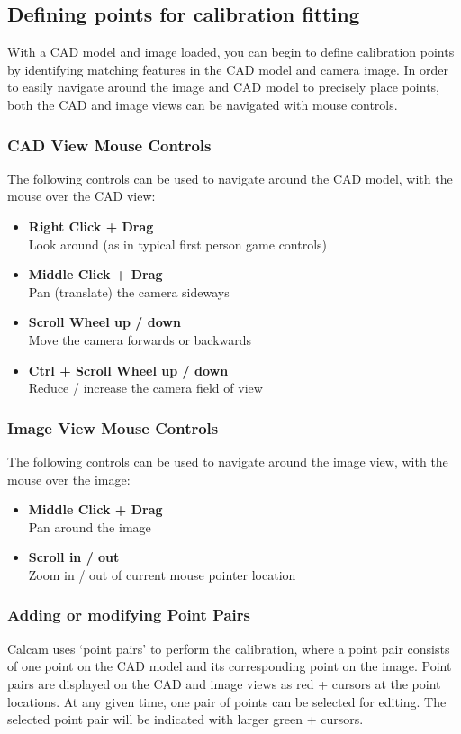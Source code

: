 \documentclass[12pt]{article}
\begin{document}
\subsection{Defining points for calibration fitting}
\label{sec:editing_pointpairs}
With a CAD model and image loaded, you can begin to define calibration points by identifying matching features in the CAD model and camera image. In order to easily navigate around the image and CAD model to precisely place points, both the CAD and image views can be navigated with mouse controls.

\subsubsection{CAD View Mouse Controls}
The following controls can be used to navigate around the CAD model, with the mouse over the CAD view:

\begin{itemize}
\item{\textbf{Right Click + Drag}\\Look around (as in typical first person game controls)}
\item{\textbf{Middle Click + Drag}\\Pan (translate) the camera sideways}
\item{\textbf{Scroll Wheel up / down}\\ Move the camera forwards or backwards}
\item{\textbf{Ctrl + Scroll Wheel up / down}\\ Reduce / increase the camera field of view}
\end{itemize}

\subsubsection{Image View Mouse Controls}
The following controls can be used to navigate around the image view, with the mouse over the image:
\begin{itemize}
\item{\textbf{Middle Click + Drag}\\Pan around the image}
\item{\textbf{Scroll in / out}\\ Zoom in / out of current mouse pointer location}
\end{itemize}


\subsubsection{Adding or modifying Point Pairs}
Calcam uses `point pairs' to perform the calibration, where a point pair consists of one point on the CAD model and its corresponding point on the image. Point pairs are displayed on the CAD and image views as red {\color{red} +} cursors at the point locations. At any given time, one pair of points can be selected for editing. The selected point pair will be indicated with larger green {\color{green} +} cursors.
\end{document}
